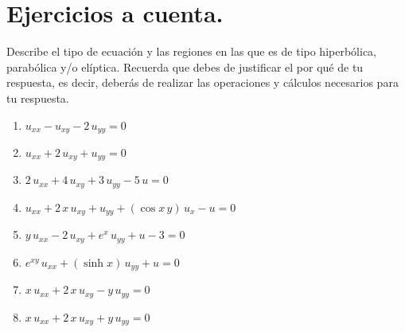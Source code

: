 \newpage

\section{Ejercicios a cuenta.}

Describe el tipo de ecuación y las regiones en las que es de tipo hiperbólica, parabólica y/o elíptica. Recuerda que debes de justificar el por qué de tu respuesta, es decir, deberás de realizar las operaciones y cálculos necesarios para tu respuesta.

\begin{enumerate}[label=\alph*)]
\item \Large{$u_{xx} - u_{xy} - 2 \, u_{yy} = 0$}
\item \Large{$u_{xx} + 2 \, u_{xy} + u_{yy} = 0$}
\item \Large{$2 \, u_{xx} + 4 \, u_{xy} + 3 \, u_{yy} - 5 \, u = 0$}
\item \Large{$u_{xx} + 2 \, x \, u_{xy} + u_{yy} + (\cos x \, y) \, u_{x} - u = 0$}
\item \Large{$y \, u_{xx} - 2 \, u_{xy} + e^{x} \, u_{yy} + u - 3 = 0$}
\item \Large{$e^{x y} \, u_{xx} + (\sinh x) \, u_{yy} + u = 0$}
\item \Large{$x \, u_{xx} + 2 \, x \, u_{xy} - y \, u_{yy} = 0$}
\item \Large{$x \, u_{xx} + 2 \, x \, u_{xy} + y \, u_{yy} = 0$}
\end{enumerate}

